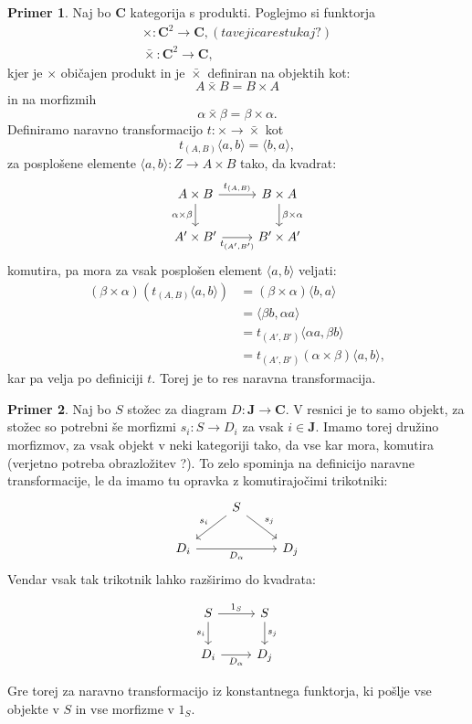 \documentclass[12pt,a4paper]{book}
\theoremstyle{definition}
\theoremstyle{plain}
\theoremstyle{definition}
\newtheorem{primer}{Primer}[section]
\theoremstyle{remark}
\newcommand{\cat}[1]{\textbf{#1}}
\begin{document}
\begin{primer}
Naj bo \cat{C} kategorija s produkti. Poglejmo si funktorja
\begin{align*}
\times : \cat{C}^2 \to \cat{C}, (ta vejica res tukaj ?)\\
\bar{\times} : \cat{C}^2 \to \cat{C},
\end{align*}
kjer je $\times$ običajen produkt in je $\bar{\times}$ definiran na objektih kot:
$$ A \bar{\times} B = B \times A$$
in na morfizmih
$$ \alpha \bar{\times} \beta = \beta \times \alpha.$$
Definiramo naravno transformacijo $t : \times \to \bar{\times}$ kot
$$t_{(A,B)}\langle a,b \rangle = \langle b,a \rangle,$$
za posplošene elemente $\langle a,b \rangle : Z \to A \times B$ tako, da kvadrat:
$$ \begin{tikzcd}
A \times B \ar[d, "\alpha \times \beta"'] \ar[r, "t_{(A,B)}"] & B \times A \ar[d, "\beta \times \alpha"] \\
A' \times B' \ar[r, "t_{(A',B')}"'] & B' \times A'
\end{tikzcd} $$
komutira, pa mora za vsak posplošen element $\langle a,b \rangle$ veljati:
\begin{align*}
(\beta \times \alpha)(t_{(A,B)}\langle a,b \rangle ) &= (\beta \times \alpha)\langle b,a \rangle \\
& = \langle \beta b,\alpha a \rangle \\
& = t_{(A',B')}\langle \alpha a, \beta b \rangle \\
& = t_{(A', B')}(\alpha \times \beta)\langle a,b \rangle,
\end{align*}
kar pa velja po definiciji $t$. Torej je to res naravna transformacija.
\end{primer}

\begin{primer}
Naj bo $S$ stožec za diagram $D : \cat{J} \to \cat{C}$. V resnici je to samo objekt, za stožec so potrebni še morfizmi $s_i : S \to D_i$ za vsak $i \in \cat{J}$. Imamo torej družino morfizmov, za vsak objekt v neki kategoriji tako, da vse kar mora, komutira (verjetno potreba obrazložitev ?). To zelo spominja na definicijo naravne transformacije, le da imamo tu opravka z komutirajočimi trikotniki:
$$ \begin{tikzcd}
& S \ar[dl, "s_i"'] \ar[dr, "s_j"] & \\
D_i \ar[rr, "D_\alpha"'] & & D_j
\end{tikzcd} $$
Vendar vsak tak trikotnik lahko razširimo do kvadrata:

$$ \begin{tikzcd}
S \ar[d, "s_i"'] \ar[r, "1_S"] & S \ar[d, "s_j"]\\
D_i \ar[r, "D_\alpha"'] & D_j
\end{tikzcd} $$

Gre torej za naravno transformacijo iz konstantnega funktorja, ki pošlje vse objekte v $S$ in vse morfizme v $1_S$.
\end{primer}
\end{document}
